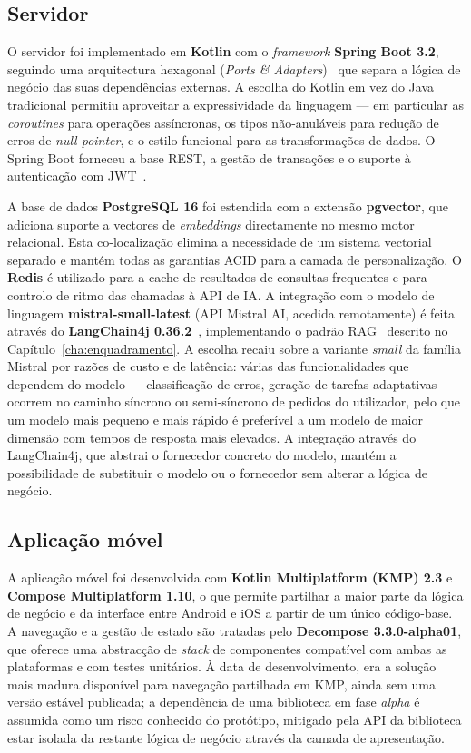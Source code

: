 \subsection*{Servidor}

O servidor foi implementado em \textbf{Kotlin} com o \emph{framework} \textbf{Spring Boot 3.2}, seguindo uma arquitectura hexagonal (\emph{Ports \& Adapters})~\cite{cockburn2005hexagonal} que separa a lógica de negócio das suas dependências externas. A escolha do Kotlin em vez do Java tradicional permitiu aproveitar a expressividade da linguagem --- em particular as \emph{coroutines} para operações assíncronas, os tipos não-anuláveis para redução de erros de \emph{null pointer}, e o estilo funcional para as transformações de dados. O Spring Boot forneceu a base REST, a gestão de transações e o suporte à autenticação com JWT~\cite{rfc7519}.

A base de dados \textbf{PostgreSQL 16} foi estendida com a extensão \textbf{pgvector}, que adiciona suporte a vectores de \emph{embeddings} directamente no mesmo motor relacional. Esta co-localização elimina a necessidade de um sistema vectorial separado e mantém todas as garantias ACID para a camada de personalização. O \textbf{Redis} é utilizado para a cache de resultados de consultas frequentes e para controlo de ritmo das chamadas à API de IA. A integração com o modelo de linguagem \textbf{mistral-small-latest} (API Mistral AI, acedida remotamente) é feita através do \textbf{LangChain4j 0.36.2}~\cite{langchain4j}, implementando o padrão RAG~\cite{lewis2020rag} descrito no Capítulo~\ref{cha:enquadramento}. A escolha recaiu sobre a variante \emph{small} da família Mistral por razões de custo e de latência: várias das funcionalidades que dependem do modelo --- classificação de erros, geração de tarefas adaptativas --- ocorrem no caminho síncrono ou semi-síncrono de pedidos do utilizador, pelo que um modelo mais pequeno e mais rápido é preferível a um modelo de maior dimensão com tempos de resposta mais elevados. A integração através do LangChain4j, que abstrai o fornecedor concreto do modelo, mantém a possibilidade de substituir o modelo ou o fornecedor sem alterar a lógica de negócio.

\subsection*{Aplicação móvel}

A aplicação móvel foi desenvolvida com \textbf{Kotlin Multiplatform (KMP) 2.3} e \textbf{Compose Multiplatform 1.10}, o que permite partilhar a maior parte da lógica de negócio e da interface entre Android e iOS a partir de um único código-base. A navegação e a gestão de estado são tratadas pelo \textbf{Decompose 3.3.0-alpha01}, que oferece uma abstracção de \emph{stack} de componentes compatível com ambas as plataformas e com testes unitários. À data de desenvolvimento, era a solução mais madura disponível para navegação partilhada em KMP, ainda sem uma versão estável publicada; a dependência de uma biblioteca em fase \emph{alpha} é assumida como um risco conhecido do protótipo, mitigado pela API da biblioteca estar isolada da restante lógica de negócio através da camada de apresentação.

